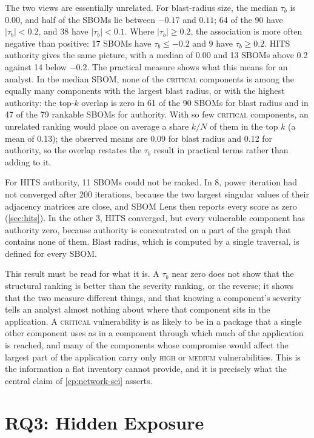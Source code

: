 The two views are essentially unrelated. For blast-radius size, the median \(\tau_b\) is 0.00, and half of the SBOMs lie between \(-0.17\) and \(0.11\); 64 of the 90 have \(|\tau_b| < 0.2\), and 38 have \(|\tau_b| < 0.1\). Where \(|\tau_b| \geq 0.2\), the association is more often negative than positive: 17 SBOMs have \(\tau_b \leq -0.2\) and 9 have \(\tau_b \geq 0.2\). HITS authority gives the same picture, with a median of 0.00 and 13 SBOMs above 0.2 against 14 below \(-0.2\). The practical measure shows what this means for an analyst. In the median SBOM, none of the \textsc{critical} components is among the equally many components with the largest blast radius, or with the highest authority: the top-\(k\) overlap is zero in 61 of the 90 SBOMs for blast radius and in 47 of the 79 rankable SBOMs for authority. With so few \textsc{critical} components, an unrelated ranking would place on average a share \(k/N\) of them in the top \(k\) (a mean of 0.13); the observed means are 0.09 for blast radius and 0.12 for authority, so the overlap restates the \(\tau_b\) result in practical terms rather than adding to it.

For HITS authority, 11 SBOMs could not be ranked. In 8, power iteration had not converged after 200 iterations, because the two largest singular values of their adjacency matrices are close, and SBOM Lens then reports every score as zero (\autoref{sec:hits}). In the other 3, HITS converged, but every vulnerable component has authority zero, because authority is concentrated on a part of the graph that contains none of them. Blast radius, which is computed by a single traversal, is defined for every SBOM.

This result must be read for what it is. A \(\tau_b\) near zero does not show that the structural ranking is better than the severity ranking, or the reverse; it shows that the two measure different things, and that knowing a component's severity tells an analyst almost nothing about where that component sits in the application. A \textsc{critical} vulnerability is as likely to be in a package that a single other component uses as in a component through which much of the application is reached, and many of the components whose compromise would affect the largest part of the application carry only \textsc{high} or \textsc{medium} vulnerabilities. This is the information a flat inventory cannot provide, and it is precisely what the central claim of \autoref{cp:network-sci} asserts.


\section{RQ3: Hidden Exposure}
\label{sec:eval-rq3}

